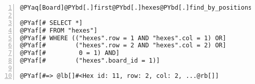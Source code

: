 \begin{Verbatim}[commandchars=@\[\],numbers=left,firstnumber=1,stepnumber=1]
@PYaq[Board]@PYbd[.]first@PYbd[.]hexes@PYbd[.]find_by_positions(@PYbd[@lb[]]@PYbd[@lb[]]@PYag[1], @PYag[1]@PYbd[@rb[]], @PYbd[@lb[]]@PYag[2], @PYag[2]@PYbd[@rb[]]@PYbd[@rb[]])

@PYaf[# SELECT *]
@PYaf[# FROM "hexes"]
@PYaf[# WHERE (("hexes".row = 1 AND "hexes".col = 1) OR]
@PYaf[#        ("hexes".row = 2 AND "hexes".col = 2) OR]
@PYaf[#         0 = 1) AND]
@PYaf[#        ("hexes".board_id = 1)]

@PYaf[#=> @lb[]#<Hex id: 11, row: 2, col: 2, ...@rb[]]
\end{Verbatim}
